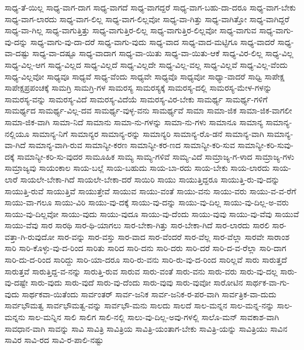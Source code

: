 {ಸಾಧ್ಯ-ತೆ-ಯಿಲ್ಲ
ಸಾಧ್ಯ-ವಾಗ-ದಾಗ
ಸಾಧ್ಯ-ವಾಗದೆ
ಸಾಧ್ಯ-ವಾಗದ್ದರೆ
ಸಾಧ್ಯ-ವಾಗ-ಬಹು-ದಾ-ದರೂ
ಸಾಧ್ಯ-ವಾಗ-ಬೇಕು
ಸಾಧ್ಯ-ವಾಗ-ಲಾರದು
ಸಾಧ್ಯ-ವಾಗ-ಲಿಲ್ಲ
ಸಾಧ್ಯ-ವಾಗ-ಲಿಲ್ಲವೋ
ಸಾಧ್ಯ-ವಾ-ಗಿತ್ತು
ಸಾಧ್ಯ-ವಾಗಿತ್ತೋ
ಸಾಧ್ಯ-ವಾಗಿದ್ದರೆ
ಸಾಧ್ಯ-ವಾ-ಗಿಲ್ಲ
ಸಾಧ್ಯ-ವಾಗುತ್ತಿತ್ತು
ಸಾಧ್ಯ-ವಾಗುತ್ತಿರ-ಲಿಲ್ಲ
ಸಾಧ್ಯ-ವಾಗುತ್ತಿರ-ಲಿಲ್ಲವೋ
ಸಾಧ್ಯ-ವಾಗುವ
ಸಾಧ್ಯ-ವಾಗು-ವು-ದನ್ನು
ಸಾಧ್ಯ-ವಾಗು-ವು-ದಾ-ದರೆ
ಸಾಧ್ಯ-ವಾಗು-ವುದು
ಸಾಧ್ಯ-ವಾದ
ಸಾಧ್ಯ-ವಾದ-ಮಟ್ಟಿಗೂ
ಸಾಧ್ಯ-ವಾದರೆ
ಸಾಧ್ಯ-ವಾ-ದಷ್ಟು
ಸಾಧ್ಯ-ವಾ-ದಷ್ಟೂ
ಸಾಧ್ಯ-ವಾದಾಗ
ಸಾಧ್ಯ-ವಾ-ಯಿತು
ಸಾಧ್ಯ-ವಾ-ಯಿತು-ಆಕೆ
ಸಾಧ್ಯ-ವಿರ-ಲಿಲ್ಲ
ಸಾಧ್ಯ-ವಿಲ್ಲ
ಸಾಧ್ಯ-ವಿಲ್ಲ-ಆಗ
ಸಾಧ್ಯ-ವಿಲ್ಲದ
ಸಾಧ್ಯ-ವಿಲ್ಲದೆ
ಸಾಧ್ಯ-ವಿಲ್ಲದೇ
ಸಾಧ್ಯ-ವಿಲ್ಲ-ವಲ್ಲ
ಸಾಧ್ಯ-ವಿಲ್ಲವೆ
ಸಾಧ್ಯ-ವಿಲ್ಲ-ವೆಂದು
ಸಾಧ್ಯ-ವಿಲ್ಲವೋ
ಸಾಧ್ಯವೂ
ಸಾಧ್ಯವೆ
ಸಾಧ್ಯ-ವೆಂದು
ಸಾಧ್ಯವೇ
ಸಾಧ್ಯವೊ
ಸಾಧ್ಯವೋ
ಸಾಧ್ಯಾ-ವಾದರೆ
ಸಾಧ್ವಿ
ಸಾಪೇಕ್ಷ
ಸಾಪೇಕ್ಷಪ್ರಪಂಚಕ್ಕೆ
ಸಾಮಗ್ರಿ
ಸಾಮಗ್ರಿ-ಗಳ
ಸಾಮರಸ್ಯ
ಸಾಮರಸ್ಯಕ್ಕೆ
ಸಾಮರಸ್ಯ-ದಲ್ಲಿ
ಸಾಮರಸ್ಯ-ಮೇಳ-ಗಳನ್ನು
ಸಾಮರಸ್ಯ-ವನ್ನು
ಸಾಮರಸ್ಯ-ವಿದೆ
ಸಾಮರಸ್ಯ-ವಿದೆಯೆ
ಸಾಮರಸ್ಯ-ವಿರ-ಬೇಕು
ಸಾಮರ್ಥ್ಯ
ಸಾಮರ್ಥ್ಯ-ಗಳಿಗೆ
ಸಾಮರ್ಥ್ಯದ
ಸಾಮರ್ಥ್ಯ-ವಿಲ್ಲ-ದವ
ಸಾಮರ್ಥ್ಯ-ವುಳ್ಳ-ವನು
ಸಾಮರ್ಥ್ಯವೆ
ಸಾಮಾ
ಸಾಮಾ-ಜಿಕ
ಸಾಮಾ-ಜಿಕ-ವಾಗಲೀ
ಸಾಮಾ-ಜಿಕ-ವಾಗಿ
ಸಾಮಾ-ನಿದೆ
ಸಾಮಾನು
ಸಾಮಾ-ನು-ಗಳನ್ನು
ಸಾಮಾ-ನು-ಗಳು
ಸಾಮಾನೂ
ಸಾಮಾನ್ಯ
ಸಾಮಾನ್ಯ-ನಲ್ಲಿಯೂ
ಸಾಮಾನ್ಯ-ನಿಗೆ
ಸಾಮಾನ್ಯರ
ಸಾಮಾನ್ಯ-ರನ್ನು
ಸಾಮಾನ್ಯರಿ
ಸಾಮಾನ್ಯ-ರೊ-ಡನೆ
ಸಾಮಾನ್ಯ-ವಾಗಿ
ಸಾಮಾನ್ಯ-ವಾ-ಗಿದೆ
ಸಾಮಾನ್ಯ-ವಾಗಿ-ರುವ
ಸಾಮಾನ್ಯೀ-ಕರಣ
ಸಾಮಾನ್ಯೀ-ಕರ-ಣದ
ಸಾಮಾನ್ಯೀ-ಕರಿ-ಸುವ
ಸಾಮಾನ್ಯೀ-ಕರಿ-ಸುವು-ದಕ್ಕೆ
ಸಾಮಾನ್ಯೀ-ಕರಿ-ಸು-ವುದರ
ಸಾಮೂಹಿಕ
ಸಾಮ್ಯ
ಸಾಮ್ಯ-ಗಳಿವೆ
ಸಾಮ್ಯ-ವಿದೆ
ಸಾಮ್ರಾಜ್ಯ-ಗ-ಳಾದ
ಸಾಮ್ರಾಜ್ಯ-ಗಳು
ಸಾಮ್ರಾಜ್ಯವು
ಸಾಯಂಕಾಲ
ಸಾಯ-ಬಲ್ಲೆ
ಸಾಯ-ಬಹುದು
ಸಾಯ-ಬಾ-ರದು
ಸಾಯ-ಬೇಕು
ಸಾಯ-ಲಾರದು
ಸಾಯ-ಲಾರೆ
ಸಾಯಲೇ-ಬೇಕಾ-ಗಿದೆ
ಸಾಯಲೇ-ಬೇಕಾ-ದರೆ
ಸಾಯಿರಿ
ಸಾಯು
ಸಾಯುತ್ತಿದ್ದರೂ
ಸಾಯುತ್ತಿ-ರು-ವು-ದನ್ನು
ಸಾಯುತ್ತಿ-ರುವೆ
ಸಾಯುತ್ತಿವೆ
ಸಾಯುತ್ತೇವೆ
ಸಾಯುವ
ಸಾಯು-ವಂತೆ
ಸಾಯು-ವನು
ಸಾಯು-ವರು
ಸಾಯು-ವ-ವ-ರೆಗೆ
ಸಾಯು-ವಾ-ಗಲೂ
ಸಾಯು-ವಿರಿ
ಸಾಯು-ವು-ದಕ್ಕೆ
ಸಾಯು-ವು-ದನ್ನು
ಸಾಯು-ವು-ದಿಲ್ಲ
ಸಾಯು-ವು-ದಿಲ್ಲ-ಅ-ವರು
ಸಾಯು-ವು-ದಿಲ್ಲವೋ
ಸಾಯು-ವುದು
ಸಾಯು-ವುದೂ
ಸಾಯು-ವು-ದೆಂದು
ಸಾಯು-ವುವು
ಸಾಯು-ವು-ವೆವು
ಸಾಯುವೆ
ಸಾಯು-ವೆವು
ಸಾರ
ಸಾರಥಿ
ಸಾರ-ಥಿ-ಯಾಗಲು
ಸಾರ-ಬೇಕಾ-ಗಿತ್ತು
ಸಾರ-ಬೇಕಾ-ಗಿದೆ
ಸಾರ-ಲಾರದು
ಸಾರಲಿ
ಸಾರ-ವತ್ತಾ-ಗಿ-ರುವುದೋ
ಸಾರ-ವನ್ನು
ಸಾರ-ವಸ್ತು
ಸಾರ-ವಾದ
ಸಾರ-ವೆಂದರೆ
ಸಾರ-ವೆಲ್ಲ
ಸಾರ-ವೆಲ್ಲಾ
ಸಾರವೇ
ಸಾರಾಂಶ
ಸಾರಿ
ಸಾರಿ-ಕೊಳ್ಳು-ವು-ದ-ರಿಂದ
ಸಾರಿತು
ಸಾರಿದ
ಸಾರಿ-ದನು
ಸಾರಿ-ದರು
ಸಾರಿ-ದರೆ
ಸಾರಿ-ದ-ವ-ರೆಲ್ಲಾ
ಸಾರಿ-ದಾಗ
ಸಾರಿ-ದು-ದ-ರಿಂದ
ಸಾರಿದ್ದು
ಸಾರಿ-ಯಾ-ದರೂ
ಸಾರಿ-ರು-ವನು
ಸಾರಿ-ರು-ವು-ದ-ರಿಂದ
ಸಾರಿಲ್ಲವೆ
ಸಾರು
ಸಾರುತ್ತದೆ
ಸಾರುತ್ತವೆ
ಸಾರುತ್ತಿದ್ದ-ವ-ನನ್ನು
ಸಾರುತ್ತಿ-ರುವ
ಸಾರುವ
ಸಾರು-ವಂತೆ
ಸಾರು-ವನು
ಸಾರು-ವರು
ಸಾರು-ವು-ದಲ್ಲ
ಸಾರು-ವು-ದಷ್ಟೇ
ಸಾರು-ವುದು
ಸಾರು-ವುದೆ
ಸಾರು-ವು-ದೆಂದು
ಸಾರು-ವುವು
ಸಾರು-ವುವೋ
ಸಾರೋಟಿನ
ಸಾರ್ಥಕ-ವಾ-ಗು-ವುದು
ಸಾರ್ಥಕವಾ-ಯಿತೆಂದು
ಸಾರ್ವಂತರ್
ಸಾರ್ವ-ಜನಿಕ
ಸಾರ್ವ-ಜನಿಕ-ರ-ಪರ-ವಾಗಿ
ಸಾರ್ವತ್ರಿಕ-ವಾ-ದುದು
ಸಾರ್ವಭೌಮತ್ವ
ಸಾರ್ವಭೌಮತ್ವ-ವನ್ನು
ಸಾರ್ವಭೌ-ಮನು
ಸಾಲದು
ಸಾಲದೆ
ಸಾಲ-ಮನ್ನನ
ಸಾಲ-ಮನ್ನ-ನನ್ನು
ಸಾಲ-ಮನ್ನನು
ಸಾಲ-ಮನ್ನಿನ
ಸಾಲಿ
ಸಾಲಿಗ
ಸಾಲಿ-ನಲ್ಲಿ
ಸಾಲು-ವು-ದಿಲ್ಲ-ಅವು-ಗಳಲ್ಲಿ
ಸಾಲೊ-ಮನ್
ಸಾವಕಾಶ-ವಾಗಿ
ಸಾವಧಾನ-ವಾಗಿ
ಸಾವನ್ನು
ಸಾವಿ
ಸಾವಿತ್ರಿ
ಸಾವಿತ್ರಿಯ
ಸಾವಿತ್ರಿ-ಯಂತಾಗ-ಬೇಕು
ಸಾವಿತ್ರಿ-ಯನ್ನು
ಸಾವಿತ್ರಿಯು
ಸಾವಿನ
ಸಾವಿರ
ಸಾವಿ-ರದ
ಸಾವಿ-ರ-ಪಾಲಿ-ನಷ್ಟು
}
